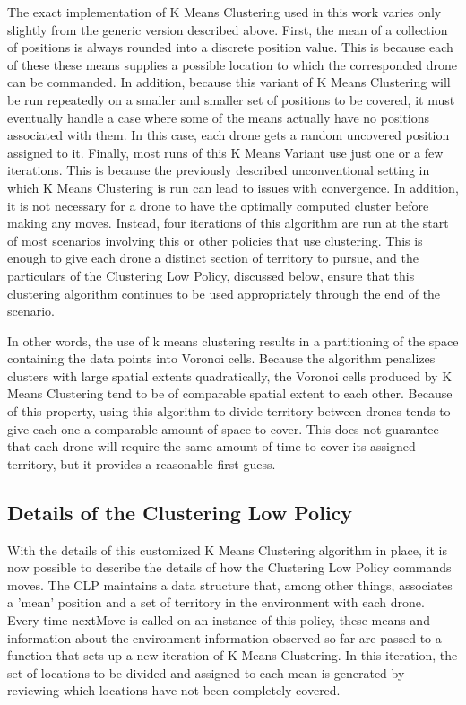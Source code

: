 The exact implementation of K Means Clustering used in this work varies only slightly from the generic version described above. First, the mean of a collection of positions is always rounded into a discrete position value. This is because each of these these means supplies a possible location to which the corresponded drone can be commanded. In addition, because this variant of K Means Clustering will be run repeatedly on a smaller and smaller set of positions to be covered, it must eventually handle a case where some of the means actually have no positions associated with them. In this case, each drone gets a random uncovered position assigned to it. Finally, most runs of this K Means Variant use just one or a few iterations. This is because the previously described unconventional setting in which K Means Clustering is run can lead to issues with convergence. In addition, it is not necessary for a drone to have the optimally computed cluster before making any moves. Instead, four iterations of this algorithm are run at the start of most scenarios involving this or other policies that use clustering. This is enough to give each drone a distinct section of territory to pursue, and the particulars of the Clustering Low Policy, discussed below, ensure that this clustering algorithm continues to be used appropriately through the end of the scenario.

In other words, the use of k means clustering results in a partitioning of the space containing the data points into Voronoi cells. Because the algorithm penalizes clusters with large spatial extents quadratically, the Voronoi cells produced by K Means Clustering tend to be of comparable spatial extent to each other. Because of this property, using this algorithm to divide territory between drones tends to give each one a comparable amount of space to cover. This does not guarantee that each drone will require the same amount of time to cover its assigned territory, but it provides a reasonable first guess.

\subsection{Details of the Clustering Low Policy}

With the details of this customized K Means Clustering algorithm in place, it is now possible to describe the details of how the Clustering Low Policy commands moves. The CLP maintains a data structure that, among other things, associates a 'mean' position and a set of territory in the environment with each drone. Every time nextMove is called on an instance of this policy, these means and information about the environment information observed so far are passed to a function that sets up a new iteration of K Means Clustering. In this iteration, the set of locations to be divided and assigned to each mean is generated by reviewing which locations have not been completely covered.

